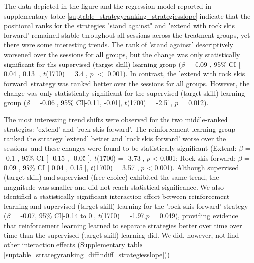 The data depicted in the figure and the regression model reported in supplementary table \ref{suptable_strategyranking_strategiesslope} indicate that the positional ranks for the strategies "stand against" and "extend with rock skis forward" remained stable throughout all sessions across the treatment groups, yet there were some interesting trends. The rank of 'stand against' descriptively worsened over the sessions for all groups, but the change was only statistically significant for the supervised (target skill) learning group  ($\beta$ = 0.09 , 95\% CI [ 0.04 ,  0.13 ], $t$(1700) = 3.4 , $p$  $<$  0.001). In contrast, the 'extend with rock skis forward' strategy was ranked better over the sessions for all groups. However, the change was only statistically significant for the supervised (target skill) learning group ($\beta$ = -0.06 , 95\% CI[-0.11, -0.01], $t$(1700) = -2.51, $p$ = 0.012). 

The most interesting trend shifts were observed for the two middle-ranked strategies: 'extend' and 'rock skis forward'. The reinforcement learning group ranked the strategy 'extend' better and 'rock skis forward' worse over the sessions, and these changes were found to be statistically significant (Extend: $\beta$ = -0.1 , 95\% CI [ -0.15 ,  -0.05 ], $t$(1700) = -3.73 , $p$  <  0.001; Rock skis forward:  $\beta$ = 0.09 , 95\% CI [ 0.04 ,  0.15 ], $t$(1700) = 3.57 , $p$  <  0.001). Although supervised (target skill) and supervised (free choice) exhibited the same trend, the magnitude was smaller and did not reach statistical significance. We also identified a statistically significant interaction effect between reinforcement learning and supervised (target skill) learning for the 'rock skis forward' strategy ($\beta$ = -0.07, 95\% CI[-0.14 to 0], $t$(1700) = -1.97,$p$ = 0.049), providing evidence that reinforcement learning learned to separate strategies better over time over time than the supervised (target skill) learning did. We did, however, not find other interaction effects (Supplementary table \ref{suptable_strategyranking_diffindiff_strategiesslope})) 
